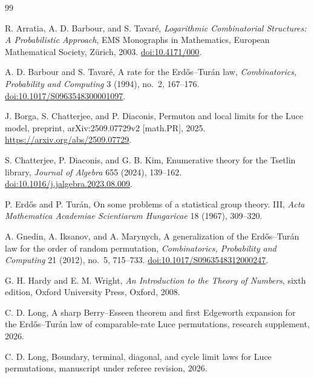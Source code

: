 \documentclass[11pt]{article}
\theoremstyle{remark}
\begin{document}
\begin{thebibliography}{99}

R. Arratia, A. D. Barbour, and S. Tavar\'e,
\newblock \emph{Logarithmic Combinatorial Structures: A Probabilistic
Approach},
\newblock EMS Monographs in Mathematics, European Mathematical Society,
Z\"urich, 2003.
\newblock \href{https://doi.org/10.4171/000}{doi:10.4171/000}.

A. D. Barbour and S. Tavar\'e,
\newblock A rate for the Erd\H{o}s--Tur\'an law,
\newblock \emph{Combinatorics, Probability and Computing} 3 (1994), no.~2,
167--176.
\newblock \href{https://doi.org/10.1017/S0963548300001097}
{doi:10.1017/S0963548300001097}.

J. Borga, S. Chatterjee, and P. Diaconis,
\newblock Permuton and local limits for the Luce model,
\newblock preprint, arXiv:2509.07729v2 [math.PR], 2025.
\newblock \url{https://arxiv.org/abs/2509.07729}.

S. Chatterjee, P. Diaconis, and G. B. Kim,
\newblock Enumerative theory for the Tsetlin library,
\newblock \emph{Journal of Algebra} 655 (2024), 139--162.
\newblock \href{https://doi.org/10.1016/j.jalgebra.2023.08.009}
{doi:10.1016/j.jalgebra.2023.08.009}.

P. Erd\H{o}s and P. Tur\'an,
\newblock On some problems of a statistical group theory. III,
\newblock \emph{Acta Mathematica Academiae Scientiarum Hungaricae} 18
(1967), 309--320.

A. Gnedin, A. Iksanov, and A. Marynych,
\newblock A generalization of the Erd\H{o}s--Tur\'an law for the order of
random permutation,
\newblock \emph{Combinatorics, Probability and Computing} 21 (2012), no.~5,
715--733.
\newblock \href{https://doi.org/10.1017/S0963548312000247}
{doi:10.1017/S0963548312000247}.

G. H. Hardy and E. M. Wright,
\newblock \emph{An Introduction to the Theory of Numbers}, sixth edition,
\newblock Oxford University Press, Oxford, 2008.

C. D. Long,
\newblock A sharp Berry--Esseen theorem and first Edgeworth expansion for the
Erd\H{o}s--Tur\'an law of comparable-rate Luce permutations,
\newblock research supplement, 2026.

C. D. Long,
\newblock Boundary, terminal, diagonal, and cycle limit laws for Luce
permutations,
\newblock manuscript under referee revision, 2026.


\end{thebibliography}
\end{document}
